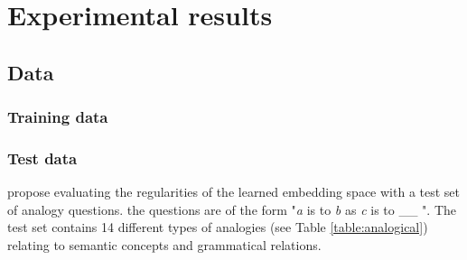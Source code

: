 
\section{Experimental results}

\subsection{Data}

\subsubsection{Training data}

\subsubsection{Test data}
\cite{mikolov3} propose evaluating the regularities of the learned embedding space with a test set of analogy questions. the questions are of the form "{\it a} is to {\it b} as {\it c} is to \_\_ ". The test set contains 14 different types of analogies (see Table \ref{table:analogical}) relating to semantic concepts and grammatical relations. 

